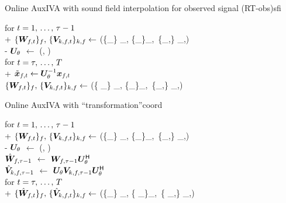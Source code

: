 \documentclass[sip,biber]{now-journal}
\begin{document}
\begin{algorithm}{Online AuxIVA with sound field interpolation for observed signal (RT-obs)}{sfi}
  \begin{pseudo}
    for $t = 1,\, \dots,\, \tau - 1$ \\+
      $\{\Demix _{\ft}\}_{\freq},\, \{\cov _{\src,\ft}\} _{\src,\freq} \gets$ (\{\Obs _{\ft}\} _{\freq}, \{\Demix _{\ft[-1]}\}_{\freq},\, \{\cov _{\src,\ft[-1]}\} _{\src,\freq}) \\-
    $\bm{U} _{\theta}$ $\gets$ (\Mic, \rotSpat) \\
    for $t = \tau,\, \dots,\, T$ \\+
      $\refpos{\Obs} _{\ft} \gets \rotMat _{\rotSpat} ^{-1} \Obs _{\ft}$ \ct{$(\forall \freq)$} \\
      $\{\Demix _{\ft}\}_{\freq},\, \{\cov _{\src,\ft}\} _{\src,\freq} \gets$ (\{ _{\ft}\} _{\freq}, \{\Demix _{\ft[-1]}\}_{\freq},\, \{\cov _{\src,\ft[-1]}\} _{\src,\freq})
  \end{pseudo}
\end{algorithm}
\begin{algorithm}{Online AuxIVA with ``transformation''}{coord}
  \begin{pseudo}
    for $t = 1,\, \dots,\, \tau - 1$ \\+
      $\{\Demix _{\ft}\}_{\freq},\, \{\cov _{\src,\ft}\} _{\src,\freq} \gets$ (\{\Obs _{\ft}\} _{\freq}, \{\Demix _{\ft[-1]}\}_{\freq},\, \{\cov _{\src,\ft[-1]}\} _{\src,\freq}) \\-
    $\bm{U} _{\theta}$ $\gets$ (\Mic, \rotSpat) \\
    {$\hat{\bm{W}} _{f,\tau - 1}$} $\gets$ $\bm{W} _{f,\tau - 1} \bm{U} _{\theta} ^{\mathsf{H}}$ \ct{$(\forall \freq)$} \\
    {$\hat{\bm{V}} _{k,f,\tau - 1}$} $\gets$ $\bm{U} _{\theta} \bm{V} _{k,f,\tau - 1} \bm{U} _{\theta} ^{\mathsf{H}}$ \ct{$(\forall \src,\freq)$} \\
    for $t = \tau,\, \dots,\, T$ \\+
      $\{\rot{\Demix} _{\ft}\}_{\freq},\, \{\rot{\cov} _{\src,\ft}\} _{\src,\freq} \gets$ (\{\Obs _{\ft}\} _{\freq}, \{\rot{\Demix} _{\ft[-1]}\}_{\freq},\, \{\rot{\cov} _{\src,\ft[-1]}\} _{\src,\freq})
  \end{pseudo}
\end{algorithm}
\end{document}
